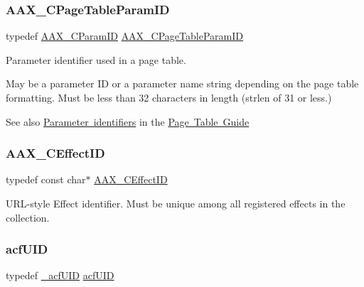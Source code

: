 \subsubsection{\texorpdfstring{AAX\_CPageTableParamID}{AAX\_CPageTableParamID}}
{\footnotesize\ttfamily typedef \mbox{\hyperlink{a00392_a1440c756fe5cb158b78193b2fc1780d1}{A\+A\+X\+\_\+\+C\+Param\+ID}} \mbox{\hyperlink{a00392_ab4e01b971dac1b25632fd9f710dd8f77}{A\+A\+X\+\_\+\+C\+Page\+Table\+Param\+ID}}}



Parameter identifier used in a page table. 

May be a parameter ID or a parameter name string depending on the page table formatting. Must be less than 32 characters in length (strlen of 31 or less.) \begin{DoxySeeAlso}{See also}
\mbox{\hyperlink{a00833_subsection_parameter_identifiers}{Parameter identifiers}} in the \mbox{\hyperlink{a00833}{Page Table Guide}} 
\end{DoxySeeAlso}
\mbox{\label{a00392_a4b8f04e1a56624da97ace7a28d550dcc}} 
\subsubsection{\texorpdfstring{AAX\_CEffectID}{AAX\_CEffectID}}
{\footnotesize\ttfamily typedef const char$\ast$ \mbox{\hyperlink{a00392_a4b8f04e1a56624da97ace7a28d550dcc}{A\+A\+X\+\_\+\+C\+Effect\+ID}}}



U\+R\+L-\/style Effect identifier. Must be unique among all registered effects in the collection. 

\mbox{\label{a00392_a66d978418e20352380f1c775c9180a93}} 
\subsubsection{\texorpdfstring{acfUID}{acfUID}}
{\footnotesize\ttfamily typedef \mbox{\hyperlink{a01405}{\+\_\+acf\+U\+ID}} \mbox{\hyperlink{a00269_ab19414382287ff80930c48a196145214}{acf\+U\+ID}}}

\mbox{\label{a00392_a53d6cf8a08224b3e813333e411ce798e}} 
